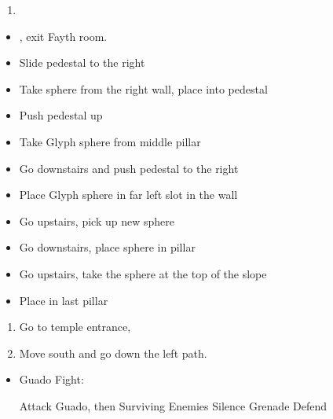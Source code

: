 \begin{enumerate}[resume]
	\item \formation{\rikku}{\tidus}{\yuna}
\end{enumerate}
\begin{trial}
	\begin{itemize}
	  \item \save, exit Fayth room.
	  \item Slide pedestal to the right
        \item Take sphere from the right wall, place into pedestal
        \item Push pedestal up
        \item Take Glyph sphere from middle pillar
        \item Go downstairs and push pedestal to the right
        \item Place Glyph sphere in far left slot in the wall
        \item Go upstairs, pick up new sphere
        \item Go downstairs, place sphere in pillar
        \item Go upstairs, take the sphere at the top of the slope
        \item Place in last pillar
	\end{itemize}
\end{trial}
\begin{enumerate}[resume]
	\item Go to temple entrance, \sd
	\item Move south and go down the left path.
\end{enumerate}
\begin{encounters}
	\begin{itemize}
		\item Guado Fight:
		      \begin{itemize}
			      \tidusf Attack Guado, then Surviving Enemies
			      \rikkuf Silence Grenade
			      \yunaf Defend
		      \end{itemize}
	\end{itemize}
\end{encounters}
